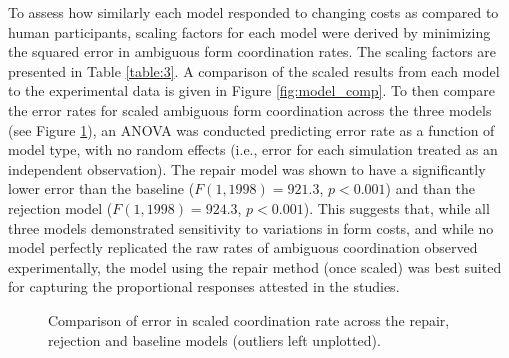 \documentclass[12pt,a4paper]{article}
\begin{document}
To assess how similarly each model responded to changing costs as compared to human participants, scaling factors for each model were derived by minimizing the squared error in ambiguous form coordination rates. The scaling factors are presented in Table \ref{table:3}. A comparison of the scaled results from each model to the experimental data is given in Figure \ref{fig:model_comp}. To then compare the error rates for scaled ambiguous form coordination across the three models (see Figure \ref{fig:2}), an ANOVA was conducted predicting error rate as a function of model type, with no random effects (i.e., error for each simulation treated as an independent observation).  The repair model was shown to have a significantly lower error than the baseline ($F(1, 1998) = 921.3$, $p<0.001$) and than the rejection model ($F(1, 1998) = 924.3$, $p<0.001$). This suggests that, while all three models demonstrated sensitivity to variations in form costs, and while no model perfectly replicated the raw rates of ambiguous coordination observed experimentally, the model using the repair method (once scaled) was best suited for capturing the proportional responses attested in the \citeauthor{rohde2012} studies.

\begin{figure}
\centering
\scalebox{.65}{}
\caption{Comparison of error in scaled coordination rate across the repair, rejection and baseline models (outliers left unplotted).}
\label{fig:2}
\end{figure}

%
\end{document}
